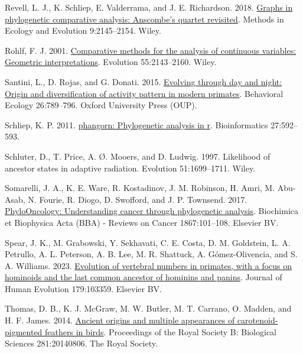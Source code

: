 \documentclass{article}
\newlength{\cslhangindent}
\newenvironment{CSLReferences}[2] %
 {\begin{list}{}{%
  \setlength{\itemindent}{0pt}
  \setlength{\leftmargin}{0pt}
  \setlength{\parsep}{0pt}
  \ifodd #1
   \setlength{\leftmargin}{\cslhangindent}
   \setlength{\itemindent}{-1\cslhangindent}
  \fi
  \setlength{\itemsep}{#2\baselineskip}}}
 {\end{list}}
\begin{document}
\begin{CSLReferences}{1}{0}
Revell, L. J., K. Schliep, E. Valderrama, and J. E. Richardson. 2018. \href{https://doi.org/10.1111/2041-210x.13067}{Graphs in phylogenetic comparative analysis: Anscombe's quartet revisited}. Methods in Ecology and Evolution 9:2145--2154. Wiley.

Rohlf, F. J. 2001. \href{https://doi.org/10.1111/j.0014-3820.2001.tb00731.x}{Comparative methods for the analysis of continuous variables: Geometric interpretations}. Evolution 55:2143--2160. Wiley.

Santini, L., D. Rojas, and G. Donati. 2015. \href{https://doi.org/10.1093/beheco/arv012}{Evolving through day and night: Origin and diversification of activity pattern in modern primates}. Behavioral Ecology 26:789--796. Oxford University Press (OUP).

Schliep, K. P. 2011. \href{https://doi.org/10.1093/bioinformatics/btq706}{{p}hangorn: Phylogenetic analysis in r}. Bioinformatics 27:592--593.

Schluter, D., T. Price, A. Ø. Mooers, and D. Ludwig. 1997. Likelihood of ancestor states in adaptive radiation. Evolution 51:1699--1711. Wiley.

Somarelli, J. A., K. E. Ware, R. Kostadinov, J. M. Robinson, H. Amri, M. Abu-Asab, N. Fourie, R. Diogo, D. Swofford, and J. P. Townsend. 2017. \href{https://doi.org/10.1016/j.bbcan.2016.10.006}{PhyloOncology: Understanding cancer through phylogenetic analysis}. Biochimica et Biophysica Acta (BBA) - Reviews on Cancer 1867:101--108. Elsevier BV.

Spear, J. K., M. Grabowski, Y. Sekhavati, C. E. Costa, D. M. Goldstein, L. A. Petrullo, A. L. Peterson, A. B. Lee, M. R. Shattuck, A. Gómez-Olivencia, and S. A. Williams. 2023. \href{https://doi.org/10.1016/j.jhevol.2023.103359}{Evolution of vertebral numbers in primates, with a focus on hominoids and the last common ancestor of hominins and panins}. Journal of Human Evolution 179:103359. Elsevier BV.

Thomas, D. B., K. J. McGraw, M. W. Butler, M. T. Carrano, O. Madden, and H. F. James. 2014. \href{https://doi.org/10.1098/rspb.2014.0806}{Ancient origins and multiple appearances of carotenoid-pigmented feathers in birds}. Proceedings of the Royal Society B: Biological Sciences 281:20140806. The Royal Society.


\end{CSLReferences}
\end{document}
